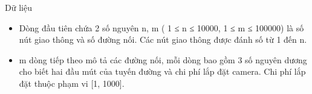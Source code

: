 Dữ liệu
\begin{itemize}
	\item     Dòng đầu tiên chứa 2 số nguyên n, m ( 1 ≤ n ≤ 10000, 1 ≤ m ≤ 100000)  là số nút giao thông và số đường nối. Các nút giao thông được đánh số từ 1 đến n.   
	\item     m dòng tiếp theo mô tả các đường nối, mỗi dòng bao gồm 3 số nguyên dương cho biết hai đầu mút của tuyến đường và chi phí lắp đặt camera. Chi phí lắp đặt thuộc phạm vi [1, 1000].   
\end{itemize}